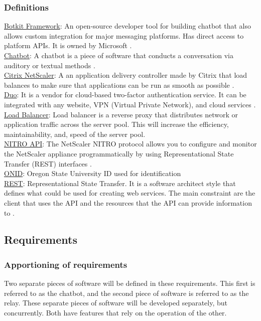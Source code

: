 \subsubsection{Definitions}
\underline{Botkit Framework}: An open-source developer tool for building chatbot that also allows custom integration for major messaging platforms. Has direct access to platform APIs. It is owned by Microsoft \cite{framework}.
\\\underline{Chatbot}: A chatbot is a piece of software that conducts a conversation via auditory or textual methods \cite{chatbot}.
\\\underline{Citrix NetScaler}: A an application delivery controller made by Citrix that load balances to make sure that applications can be run as smooth as possible \cite{netscaler}.
\\\underline{Duo}: It is a vendor for cloud-based two-factor authentication service. It can be integrated with any website, VPN (Virtual Private Network), and cloud services \cite{duo}.
\\\underline{Load Balancer}: Load balancer is a reverse proxy that distributes network or application traffic across the server pool. This will increase the efficiency, maintainability, and, speed of the server pool. 
\\\underline{NITRO API}: The NetScaler NITRO protocol allows you to configure and monitor the NetScaler appliance programmatically by using Representational State Transfer (REST) interfaces \cite{citrixnitro}.
\\\underline{ONID}: Oregon State University ID used for identification
\\\underline{REST}: Representational State Transfer. It is a software architect style that defines what could be used for creating web services. The main constraint are the client that uses the API and the resources that the API can provide information to \cite{restphd} \cite{rest}.

\subsection{Requirements}
\subsubsection{Apportioning of requirements}
Two separate pieces of software will be defined in these requirements.
This first is referred to as the chatbot, and the second piece of software is referred to as the relay.
These separate pieces of software will be developed separately, but concurrently.
Both have features that rely on the operation of the other.

